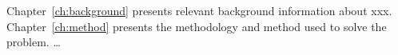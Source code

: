 Chapter~\ref{ch:background} presents relevant background information about xxx.  Chapter~\ref{ch:method} presents the methodology and method used to solve the problem. …